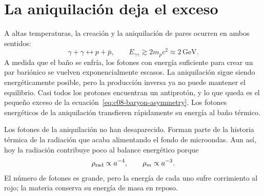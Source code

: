 \section{La aniquilación deja el exceso}

A altas temperaturas, la creación y la aniquilación de pares ocurren en ambos sentidos:
\begin{equation}
\gamma+\gamma\longleftrightarrow p+\bar p,
\qquad
E_{\gamma\gamma}\gtrsim2m_pc^2\approx2\,\mathrm{GeV}.
\end{equation}
A medida que el baño se enfría, los fotones con energía suficiente para crear un par bariónico se vuelven exponencialmente escasos. La aniquilación sigue siendo energéticamente posible, pero la producción inversa ya no puede mantener el equilibrio. Casi todos los protones encuentran un antiprotón, y lo que queda es el pequeño exceso de la ecuación~\eqref{eq:c08-baryon-asymmetry}. Los fotones energéticos de la aniquilación transfieren rápidamente su energía al baño térmico.

\begin{classroomqa}
\end{classroomqa}

\begin{classroomqa}
\end{classroomqa}

Los fotones de la aniquilación no han desaparecido. Forman parte de la historia térmica de la radiación que acaba alimentando el fondo de microondas. Aun así, hoy la radiación contribuye poco al balance energético porque
\begin{equation}
\rho_{\rm rad}\propto a^{-4},
\qquad
\rho_m\propto a^{-3}.
\end{equation}
El número de fotones es grande, pero la energía de cada uno sufre corrimiento al rojo; la materia conserva su energía de masa en reposo.

